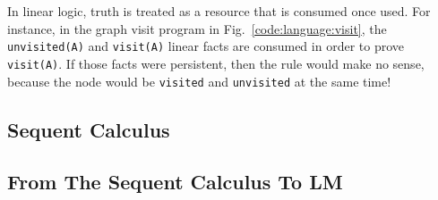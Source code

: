In linear logic, truth is treated as a resource that is consumed once used. For
instance, in the graph visit program in Fig.~\ref{code:language:visit}, the
\texttt{unvisited(A)} and \texttt{visit(A)} linear facts are consumed in order
to prove \texttt{visit(A)}. If those facts were persistent, then the rule would
make no sense, because the node would be \texttt{visited} and \texttt{unvisited}
at the same time!

\subsection{Sequent Calculus}



\subsection{From The Sequent Calculus To LM}

